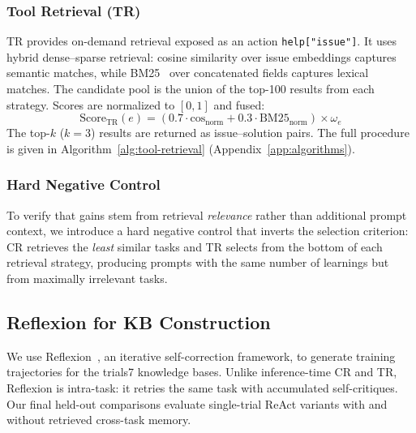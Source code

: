 \subsubsection{Tool Retrieval (TR)}
\label{sec:tool-retrieval}

TR provides on-demand retrieval exposed as an action \texttt{help["issue"]}. It uses hybrid dense--sparse retrieval: cosine similarity over issue embeddings captures semantic matches, while BM25~\cite{robertson2009bm25} over concatenated fields captures lexical matches. The candidate pool is the union of the top-100 results from each strategy. Scores are normalized to $[0, 1]$ and fused:
\begin{equation}
    \text{Score}_{\text{TR}}(e) = \left(0.7 \cdot \text{cos}_{\text{norm}} + 0.3 \cdot \text{BM25}_{\text{norm}}\right) \times \omega_{e}
\label{eq:tr-score}
\end{equation}
The top-$k$ ($k{=}3$) results are returned as issue--solution pairs. The full procedure is given in Algorithm~\ref{alg:tool-retrieval} (Appendix~\ref{app:algorithms}).

\subsubsection{Hard Negative Control}
\label{sec:hard-neg}

To verify that gains stem from retrieval \emph{relevance} rather than additional prompt context, we introduce a hard negative control that inverts the selection criterion: CR retrieves the \emph{least} similar tasks and TR selects from the bottom of each retrieval strategy, producing prompts with the same number of learnings but from maximally irrelevant tasks.

\subsection{Reflexion for KB Construction}
\label{sec:reflexion}

We use Reflexion~\cite{shinn2023reflexion}, an iterative self-correction framework, to generate training trajectories for the trials7 knowledge bases. Unlike inference-time CR and TR, Reflexion is intra-task: it retries the same task with accumulated self-critiques. Our final held-out comparisons evaluate single-trial ReAct variants with and without retrieved cross-task memory.
